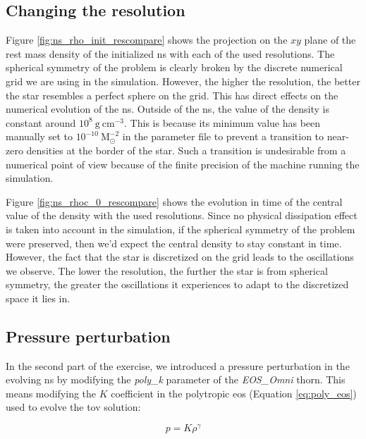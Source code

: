 \documentclass[11pt, a4paper]{article}
\begin{document}
\subsection{Changing the resolution}

Figure \ref{fig:ns_rho_init_rescompare} shows the projection on the \(xy\) plane of the rest mass density of the initialized \acrshort{ns} with each of the used resolutions. The spherical symmetry of the problem is clearly broken by the discrete numerical grid we are using in the simulation. However, the higher the resolution, the better the star resembles a perfect sphere on the grid. This has direct effects on the numerical evolution of the \acrshort{ns}. Outside of the \acrshort{ns}, the value of the density is constant around \(10^{8}\ \mathrm{g\ cm^{-3}}\). This is because its minimum value has been manually set to \(10^{-10}\ \mathrm{M_\odot^{-2}}\) in the parameter file to prevent a transition to near-zero densities at the border of the star. Such a transition is undesirable from a numerical point of view because of the finite precision of the machine running the simulation.

Figure \ref{fig:ns_rhoc_0_rescompare} shows the evolution in time of the central value of the density with the used resolutions. Since no physical dissipation effect is taken into account in the simulation, if the spherical symmetry of the problem were preserved, then we'd expect the central density to stay constant in time. However, the fact that the star is discretized on the grid leads to the oscillations we observe. The lower the resolution, the further the star is from spherical symmetry, the greater the oscillations it experiences to adapt to the discretized space it lies in.

\subsection{Pressure perturbation}

In the second part of the exercise, we introduced a pressure perturbation in the evolving \acrshort{ns} by modifying the \textit{poly\_k} parameter of the \textit{EOS\_Omni} thorn. This means modifying the \(K\) coefficient in the polytropic \acrfull{eos} (Equation \ref{eq:poly_eos}) used to evolve the \acrshort{tov} solution:

\begin{equation} \label{eq:poly_eos}
    p = K \rho^\gamma
\end{equation}
\end{document}

